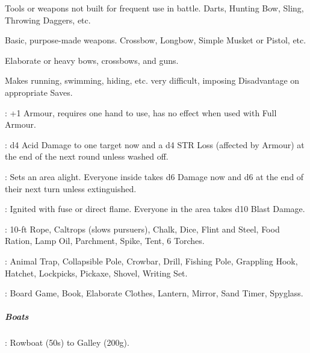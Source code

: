 \documentclass[itdr]{subfiles}
\begin{document}

 Tools or weapons not built for frequent use in battle. Darts, Hunting Bow, Sling, Throwing Daggers, etc.

 Basic, purpose-made weapons. Crossbow, Longbow, Simple Musket or Pistol, etc.

 Elaborate or heavy bows, crossbows, and guns.

\vfill



 Makes running, swimming, hiding, etc. very difficult, imposing Disadvantage on appropriate Saves.

: +1 Armour, requires one hand to use, has no effect when used with Full Armour.

\break


: d4 Acid Damage to one target now and a d4 STR Loss (affected by Armour) at the end of the next round unless washed off.

: Sets an area alight. Everyone inside takes d6 Damage now and d6 at the end of their next turn unless extinguished.

: Ignited with fuse or direct flame. Everyone in the area takes d10 Blast Damage.

: 10-ft Rope, Caltrops (slows pursuers), Chalk, Dice, Flint and Steel, Food Ration, Lamp Oil, Parchment, Spike, Tent, 6 Torches.

: Animal Trap, Collapsible Pole, Crowbar, Drill, Fishing Pole, Grappling Hook, Hatchet, Lockpicks, Pickaxe, Shovel, Writing Set.

: Board Game, Book, Elaborate Clothes, Lantern, Mirror, Sand Timer, Spyglass.

\vfill

\subparagraph{Boats}: Rowboat (50s) to Galley (200g).
\end{document}
